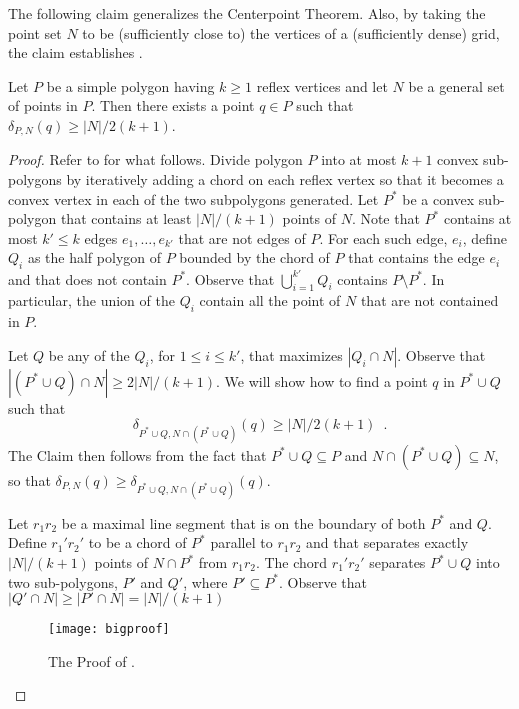\documentclass{article}
\begin{document}
The following claim generalizes the Centerpoint Theorem.  Also, by
taking the point set $N$ to be (sufficiently close to) the vertices of
a (sufficiently dense) grid, the claim establishes
. 

\begin{clm} 
Let $P$ be a simple polygon having $k\ge 1$ reflex vertices and let
$N$ be a general set of points in $P$.  Then there exists a point
$q\in P$ such that $\delta_{P,N}(q) \ge |N|/2(k+1)$.
\end{clm}
\begin{proof}
Refer to  for what follows.  Divide polygon $P$ into
at most $k+1$ convex sub-polygons by iteratively adding a chord on
each reflex vertex so that it becomes a convex vertex in each of the
two subpolygons generated.  Let $P^*$ be a convex sub-polygon that
contains at least $|N|/(k+1)$ points of $N$.  Note that $P^*$ contains
at most $k'\le k$ edges $e_1,\ldots,e_{k'}$ that are not edges of $P$.  For
each such edge, $e_i$, define $Q_i$ as the half polygon of $P$ bounded
by the chord of $P$ that contains the edge $e_i$ and that does not
contain $P^*$.  Observe that $\bigcup_{i=1}^{k'} Q_i$ contains
$P\setminus P^*$.  In particular, the union of the $Q_i$ contain all
the point of $N$ that are not contained in $P$.

Let $Q$ be any of the $Q_i$, for $1\le i\le k'$, that maximizes
$|Q_i\cap N|$.  Observe that $|(P^*\cup Q)\cap N|\ge 2|N|/(k+1)$.
We will show how to find a point $q$ in $P^*\cup Q$ such that 
\[
   \delta_{P^*\cup Q,N\cap(P^*\cup Q)}(q) \ge |N|/2(k+1) \enspace .
\]
The Claim then follows from the fact that $P^*\cup Q\subseteq P$ and
$N\cap(P^*\cup Q)\subseteq N$, so that $\delta_{P,N}(q) \ge
\delta_{P^*\cup Q,N\cap(P^*\cup Q)}(q)$.

Let $r_1r_2$ be a maximal line segment that is on the boundary of both
$P^*$ and $Q$.  Define $r_1'r_2'$ to be a chord of $P^*$ parallel to
$r_1r_2$ and that separates exactly $|N|/(k+1)$ points of $N\cap P^*$
from $r_1r_2$.  The chord $r_1'r_2'$ separates $P^*\cup Q$ into two
sub-polygons, $P'$ and $Q'$, where $P'\subseteq P^*$.  Observe that
$|Q'\cap N|\ge |P'\cap N| = |N|/(k+1)$

\begin{figure}
  \begin{center}
    \texttt{[image: bigproof]}
  \end{center}
  \caption{The Proof of .}
\end{figure}


\end{proof}
\end{document}
